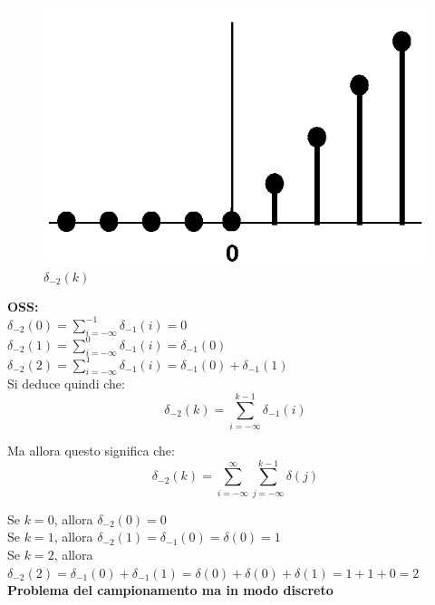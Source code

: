 	\begin{figure}[h]
		\centering
		\includegraphics[scale=0.5]{immagini/rampaDiscreta}
		\caption{ $ \delta_{-2}(k)$ }
		\label{fig: rampaDiscreta}
	\end{figure}
	
	\textbf{OSS:}\\
	$ \delta_{-2}(0) = \sum_{i=-\infty}^{-1} \delta_{-1}(i) =0 $\\
	$ \delta_{-2}(1) = \sum_{i=-\infty}^{0} \delta_{-1}(i) = \delta_{-1}(0) $\\
	$ \delta_{-2}(2) = \sum_{i=-\infty}^{1} \delta_{-1}(i) = \delta_{-1}(0) + \delta_{-1}(1) $\\
	
	Si deduce quindi che:\\
	\begin{equation*}
	\delta_{-2}(k)= \sum_{i=-\infty}^{k-1} \delta_{-1}(i)
	\end{equation*}
	
	Ma allora questo significa che:\\
	\begin{equation*}
	\delta_{-2}(k)= \sum_{i=-\infty}^{ \infty} \sum_{j=-\infty}^{k-1} \delta(j)
	\end{equation*}
	
	Se $ k=0 $, allora $ \delta_{-2}(0) =0  $\\
	Se $ k=1 $, allora $ \delta_{-2}(1) = \delta_{-1}(0) = \delta(0) = 1  $\\
	Se $ k=2 $, allora $ \delta_{-2}(2) = \delta_{-1}(0) + \delta_{-1}(1) = \delta(0) + \delta(0) + \delta(1) = 1+1+0=2  $\\
	
	\textbf{Problema del campionamento ma in modo discreto }\\
	
